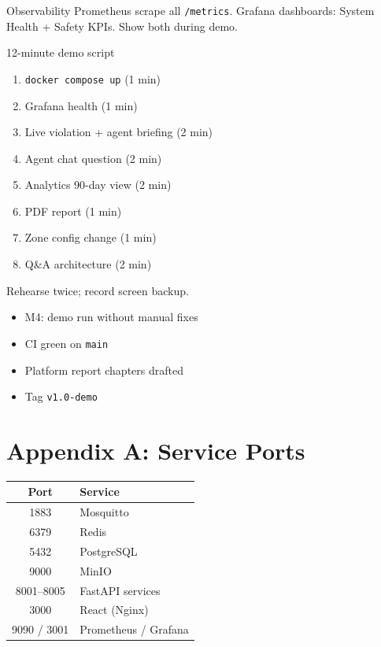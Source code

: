 \documentclass[12pt,a4paper]{report}
\begin{document}
\begin{stepbox}{Observability}
Prometheus scrape all \texttt{/metrics}. Grafana dashboards: System Health + Safety KPIs. Show both during demo.
\end{stepbox}

\begin{stepbox}{12-minute demo script}
\begin{enumerate}
    \item \texttt{docker compose up} (1 min)
    \item Grafana health (1 min)
    \item Live violation + agent briefing (2 min)
    \item Agent chat question (2 min)
    \item Analytics 90-day view (2 min)
    \item PDF report (1 min)
    \item Zone config change (1 min)
    \item Q\&A architecture (2 min)
\end{enumerate}
Rehearse twice; record screen backup.
\end{stepbox}

\begin{verifybox}
\begin{itemize}
    \item[$\square$] M4: demo run without manual fixes
    \item[$\square$] CI green on \texttt{main}
    \item[$\square$] Platform report chapters drafted
    \item[$\square$] Tag \texttt{v1.0-demo}
\end{itemize}
\end{verifybox}

\chapter{Appendix A: Service Ports}

\begin{center}
\begin{tabular}{cl}
\toprule
\textbf{Port} & \textbf{Service} \\
\midrule
1883 & Mosquitto \\
6379 & Redis \\
5432 & PostgreSQL \\
9000 & MinIO \\
8001--8005 & FastAPI services \\
3000 & React (Nginx) \\
9090 / 3001 & Prometheus / Grafana \\
\bottomrule
\end{tabular}
\end{center}
\end{document}
